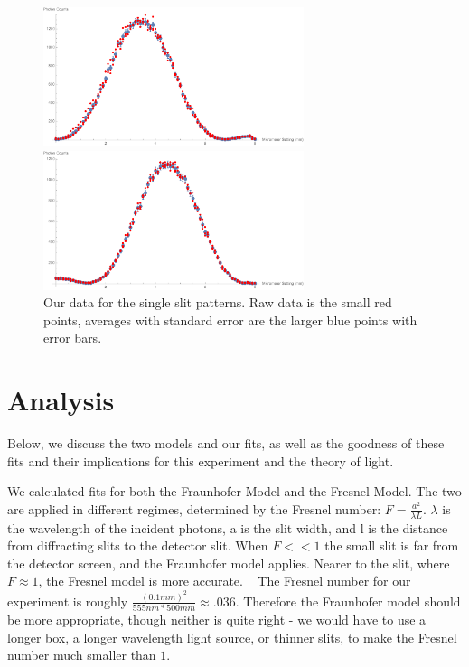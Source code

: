\documentclass[prb,preprint]{revtex4-1}
\begin{document}
\begin{figure}[h!]
\centering
\begin{minipage}[b]{0.45\linewidth}
	\includegraphics[width=3in]{far_slit_plot.pdf}
\end{minipage}
\quad
\begin{minipage}[b]{0.45\linewidth}
	\includegraphics[width=3in]{near_slit_plot.pdf}
\end{minipage}
\caption{Our data for the single slit patterns. Raw data is the small red points, averages with standard error are the larger blue points with error bars. }
\label{single_slits_plot}
\end{figure}

\section{Analysis}

Below, we discuss the two models and our fits, as well as the goodness of these fits and their implications for this experiment and the theory of light.

We calculated fits for both the Fraunhofer Model and the Fresnel Model.  The two are applied in different regimes, determined by the Fresnel number: $F = \frac{a^2}{\lambda L}$.  $\lambda$ is the wavelength of the incident photons, a is the slit width, and l is the distance from diffracting slits to the detector slit.  When $F << 1$ the small slit is far from the detector screen, and the Fraunhofer model applies.  Nearer to the slit, where $F \approx 1$, the Fresnel model is more accurate. ~\cite{wolfram} The Fresnel number for our experiment is roughly $\frac{(0.1mm)^2}{555nm*500mm} \approx .036$.  Therefore the Fraunhofer model should be more appropriate, though neither is quite right - we would have to use a longer box, a longer wavelength light source, or thinner slits, to make the Fresnel number much smaller than $1$. 
\end{document}
